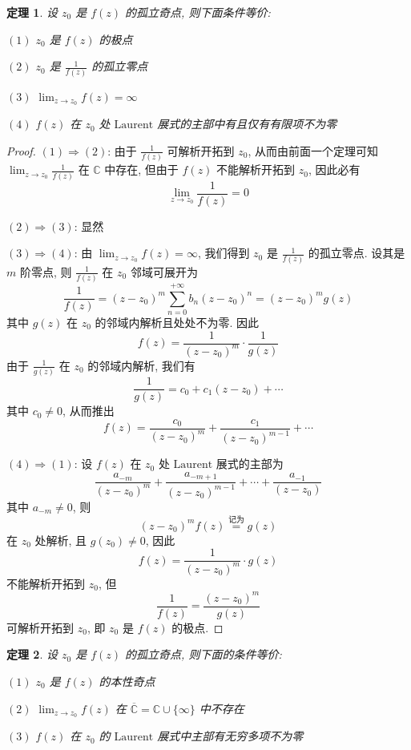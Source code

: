 \documentclass[12pt,a4paper]{article}
\newtheorem{thm}{定理}[section]  %
\begin{document}
\begin{thm}
    设 $z_0$ 是 $f(z)$ 的孤立奇点, 则下面条件等价:

    $(1)$ $z_0$ 是 $f(z)$ 的极点

    $(2)$ $z_0$ 是 $\frac{1}{f(z)}$ 的孤立零点

    $(3)$ $\lim_{z \to z_0} f(z) = \infty$

    $(4)$ $f(z)$ 在 $z_0$ 处 $\mathrm{Laurent}$ 展式的主部中有且仅有有限项不为零
\end{thm}

\begin{proof}
    $(1) \Rightarrow (2)$: 由于 $\frac{1}{f(z)}$ 可解析开拓到 $z_0$, 从而由前面一个定理可知 $\lim_{z \to z_0} \frac{1}{f(z)}$ 在 $\mathbb{C}$ 中存在, 但由于 $f(z)$ 不能解析开拓到 $z_0$, 因此必有
    \[ \lim_{z \to z_0} \frac{1}{f(z)} = 0\]

    $(2) \Rightarrow (3)$: 显然

    $(3) \Rightarrow (4)$: 由 $\lim_{z \to z_0} f(z) = \infty$, 我们得到 $z_0$ 是 $\frac{1}{f(z)}$ 的孤立零点. 设其是 $m$ 阶零点, 则 $\frac{1}{f(z)}$ 在 $z_0$ 邻域可展开为
    \[\frac{1}{f(z)} = (z-z_0)^m \sum\limits_{n = 0}^{+\infty} b_n (z-z_0)^n = (z-z_0)^m g(z)\]
    其中 $g(z)$ 在 $z_0$ 的邻域内解析且处处不为零. 因此 \[f(z) = \frac{1}{(z-z_0)^m} \cdot \frac{1}{g(z)}\]
    由于 $\frac{1}{g(z)}$ 在 $z_0$ 的邻域内解析, 我们有 \[\frac{1}{g(z)} = c_0 + c_1 (z-z_0) + \cdots\]
    其中 $c_0 \neq 0$, 从而推出 \[f(z) = \frac{c_0}{(z-z_0)^m} + \frac{c_1}{(z-z_0)^{m-1}} + \cdots\] 
    
    $(4) \Rightarrow (1)$: 设 $f(z)$ 在 $z_0$ 处 $\mathrm{Laurent}$ 展式的主部为 
    \[\frac{a_{-m}}{(z-z_0)^m} + \frac{a_{-m+1}}{(z-z_0)^{m-1}} + \cdots + \frac{a_{-1}}{(z-z_0)}\]
    其中 $a_{-m} \neq 0$, 则
    \[(z-z_0)^m f(z) \overset{\text{记为}}{=} g(z)\] 在 $z_0$ 处解析, 且 $g(z_0) \neq 0$, 因此 
    \[ f(z) = \frac{1}{(z-z_0)^m} \cdot g(z) \] 不能解析开拓到 $z_0$, 但
    \[\frac{1}{f(z)} = \frac{(z-z_0)^m}{g(z)}\] 可解析开拓到 $z_0$, 即 $z_0$ 是 $f(z)$ 的极点.
\end{proof}

\begin{thm}
    设 $z_0$ 是 $f(z)$ 的孤立奇点, 则下面的条件等价:

    $(1)$ $z_0$ 是 $f(z)$ 的本性奇点

    $(2)$ $\lim_{z \to z_0} f(z)$ 在 $\overline{\mathbb{C}} = \mathbb{C} \cup \{\infty\}$ 中不存在
    
    $(3)$ $f(z)$ 在 $z_0$ 的 $\mathrm{Laurent}$ 展式中主部有无穷多项不为零
\end{thm}
\end{document}
